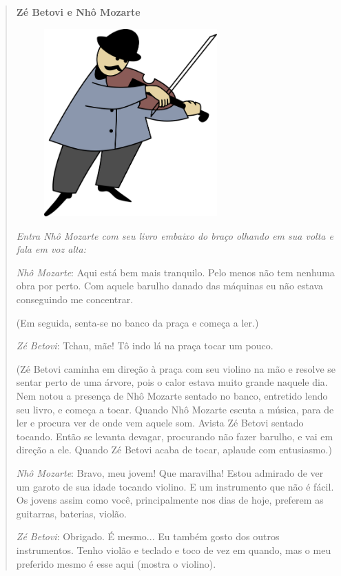 \begin{quote}
\textbf{Zé Betovi e Nhô Mozarte}

\begin{figure}
\includegraphics[width=2.61389in,height=2.83858in]{./media/image2.png}
\end{figure}

\textit{Entra Nhô Mozarte com seu livro embaixo do braço olhando em
sua volta e fala em voz alta:}

\emph{Nhô Mozarte}: Aqui está bem mais tranquilo. Pelo menos não tem
nenhuma obra por perto. Com aquele barulho danado das máquinas eu não
estava conseguindo me concentrar.

(Em seguida, senta-se no banco da praça e começa a ler.)

\emph{Zé Betovi}: Tchau, mãe! Tô indo lá na praça tocar um pouco.

(Zé Betovi caminha em
direção à praça com seu violino na mão e resolve se sentar perto de uma
árvore, pois o calor estava muito grande naquele dia. Nem notou a
presença de Nhô Mozarte sentado no banco, entretido lendo seu livro, e
começa a tocar. Quando Nhô Mozarte escuta a música, para de ler e
procura ver de onde vem aquele som. Avista Zé Betovi sentado tocando.
Então se levanta devagar, procurando não fazer barulho, e vai em direção
a ele. Quando Zé Betovi acaba de tocar, aplaude com entusiasmo.)

\emph{Nhô Mozarte}: Bravo, meu jovem! Que maravilha! Estou admirado de
ver um garoto de sua idade tocando violino. E um instrumento que não é
fácil. Os jovens assim como você, principalmente nos dias de hoje,
preferem as guitarras, baterias, violão.

\emph{Zé Betovi}: Obrigado. É mesmo... Eu também gosto dos outros
instrumentos. Tenho violão e teclado e toco de vez em quando, mas o meu
preferido mesmo é esse aqui (mostra o violino).


\end{quote}
